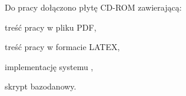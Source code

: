\newline
Do pracy dołączono płytę CD-ROM zawierającą:
\begin{itemize*}
	\item treść pracy w pliku PDF,
	\item treść pracy w formacie LATEX,
	\item implementację systemu \textsl{\NazwaSys},
	\item skrypt bazodanowy.
\end{itemize*} 
